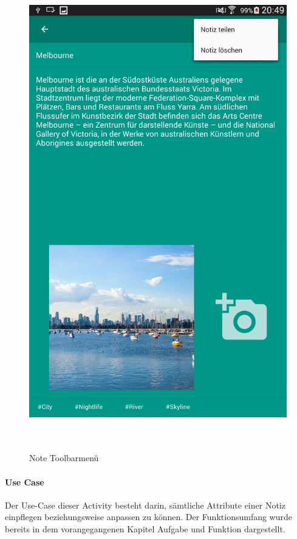 \begin{figure}[H]
\centering
\begin{minipage}[t]{1\textwidth} %
\caption{Note Toolbarmenü} %
\includegraphics[height=20cm]{img/note_toolbarMenu}\\ %
\end{minipage}
\end{figure}

\paragraph{Use Case}
Der Use-Case dieser Activity besteht darin, sämtliche Attribute einer Notiz einpflegen beziehungsweise anpassen zu können. Der Funktionsumfang wurde bereits in dem vorangegangenen Kapitel Aufgabe und Funktion dargestellt.

